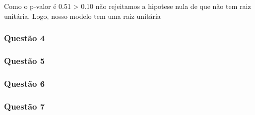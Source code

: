 \documentclass[
]{article}
\begin{document}
Como o p-valor é 0.51 \textgreater{} 0.10 não rejeitamos a hipotese nula
de que não tem raiz unitária. Logo, nosso modelo tem uma raiz unitária

\subsubsection{Questão 4}\label{questuxe3o-4}

\subsubsection{Questão 5}\label{questuxe3o-5}

\subsubsection{Questão 6}\label{questuxe3o-6}

\subsubsection{Questão 7}\label{questuxe3o-7}
\end{document}
